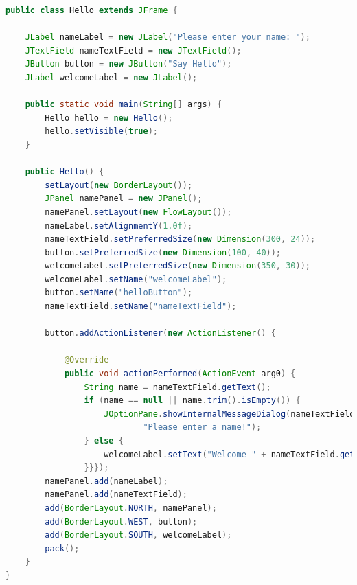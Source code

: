 \documentclass[a4paper,10pt]{article}
\begin{document}
\begin{lstlisting}[language=Java,caption=FEST Beispiel 1.a, style=MyJavaStyle]
public class Hello extends JFrame {

    JLabel nameLabel = new JLabel("Please enter your name: ");
    JTextField nameTextField = new JTextField();
    JButton button = new JButton("Say Hello");
    JLabel welcomeLabel = new JLabel();

    public static void main(String[] args) {
        Hello hello = new Hello();
        hello.setVisible(true);
    }

    public Hello() {
        setLayout(new BorderLayout());
        JPanel namePanel = new JPanel();
        namePanel.setLayout(new FlowLayout());
        nameLabel.setAlignmentY(1.0f);
        nameTextField.setPreferredSize(new Dimension(300, 24));
        button.setPreferredSize(new Dimension(100, 40));
        welcomeLabel.setPreferredSize(new Dimension(350, 30));      
        welcomeLabel.setName("welcomeLabel");
        button.setName("helloButton");
        nameTextField.setName("nameTextField");

        button.addActionListener(new ActionListener() {

            @Override
            public void actionPerformed(ActionEvent arg0) {
                String name = nameTextField.getText();
                if (name == null || name.trim().isEmpty()) {
                    JOptionPane.showInternalMessageDialog(nameTextField,
                            "Please enter a name!");
                } else {
                    welcomeLabel.setText("Welcome " + nameTextField.getText());
                }}});
        namePanel.add(nameLabel);
        namePanel.add(nameTextField);
        add(BorderLayout.NORTH, namePanel);
        add(BorderLayout.WEST, button);
        add(BorderLayout.SOUTH, welcomeLabel);
        pack();
    }
}
\end{lstlisting}
\end{document}
